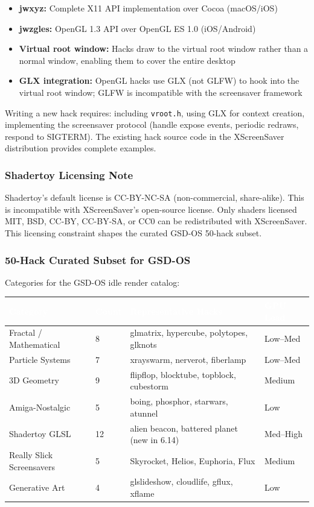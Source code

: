 \documentclass[11pt,letterpaper]{article}
\newcommand{\tableheader}[1]{\textbf{\sffamily\textcolor{white}{#1}}}
\begin{document}
\begin{itemize}[noitemsep]
  \item \textbf{jwxyz:} Complete X11 API implementation over Cocoa (macOS/iOS)
  \item \textbf{jwzgles:} OpenGL 1.3 API over OpenGL ES 1.0 (iOS/Android)
  \item \textbf{Virtual root window:} Hacks draw to the virtual root window rather than a normal window, enabling them to cover the entire desktop
  \item \textbf{GLX integration:} OpenGL hacks use GLX (not GLFW) to hook into the virtual root window; GLFW is incompatible with the screensaver framework
\end{itemize}

Writing a new hack requires: including \texttt{vroot.h}, using GLX for context creation, implementing the screensaver protocol (handle expose events, periodic redraws, respond to SIGTERM). The existing hack source code in the XScreenSaver distribution provides complete examples.

\subsubsection{Shadertoy Licensing Note}

Shadertoy's default license is CC-BY-NC-SA (non-commercial, share-alike). This is incompatible with XScreenSaver's open-source license. Only shaders licensed MIT, BSD, CC-BY, CC-BY-SA, or CC0 can be redistributed with XScreenSaver. This licensing constraint shapes the curated GSD-OS 50-hack subset.

\subsubsection{50-Hack Curated Subset for GSD-OS}

Categories for the GSD-OS idle render catalog:

\begin{center}
\begin{tabularx}{\textwidth}{L{4cm}C{1.5cm}XC{2cm}}
\toprule
{}
\tableheader{Category} & \tableheader{Count} & \tableheader{Representative Hacks} & \tableheader{GPU Load} \\
\midrule
Fractal / Mathematical & 8 & glmatrix, hypercube, polytopes, glknots & Low--Med \\
Particle Systems & 7 & xrayswarm, nerverot, fiberlamp & Low--Med \\
3D Geometry & 9 & flipflop, blocktube, topblock, cubestorm & Medium \\
Amiga-Nostalgic & 5 & boing, phosphor, starwars, atunnel & Low \\
Shadertoy GLSL & 12 & alien beacon, battered planet (new in 6.14) & Med--High \\
Really Slick Screensavers & 5 & Skyrocket, Helios, Euphoria, Flux & Medium \\
Generative Art & 4 & glslideshow, cloudlife, gflux, xflame & Low \\
\bottomrule
\end{tabularx}
\end{center}
\end{document}
